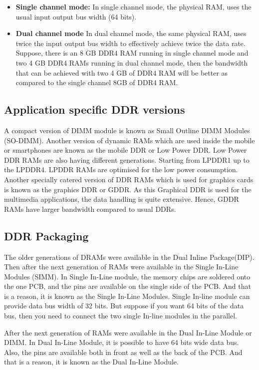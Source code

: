\begin{itemize}
    \item \textbf{Single channel mode:} In single channel mode, the physical RAM, uses the usual input output bus width (64 bits).
    \item \textbf{Dual channel mode} In dual channel mode, the same physical RAM, uses twice the input output bus width to effectively achieve twice the data rate. Suppose, there is an 8 GB DDR4 RAM running in single channel mode and two 4 GB DDR4 RAMs running in dual channel mode, then the bandwidth that can be achieved with two 4 GB of DDR4 RAM will be better as compared to the single channel 8GB of DDR4 RAM.
\end{itemize}

\subsection{Application specific DDR versions}
A compact version of DIMM module is known as Small Outline DIMM Modules (SO-DIMM). Another version of dynamic RAMs which are used inside the mobile or smartphones are known as the mobile DDR or Low Power DDR. Low Power DDR RAMs are also having different generations. Starting from LPDDR1 up to the LPDDR4. LPDDR RAMs are optimised for the low power consumption. Another specially catered version of DDR RAMs which is used for graphics cards is known as the graphics DDR or GDDR. As this Graphical DDR is used for the multimedia applications, the data handling is quite extensive. Hence, GDDR RAMs have larger bandwidth compared to usual DDRs. 

\subsection{DDR Packaging}
The older generations of DRAMs were available in the Dual Inline Package(DIP). Then after the next generation of RAMs were available in the Single In-Line Modules (SIMM). In Single In-Line module, the memory chips are soldered onto the one PCB, and the pins are available on the single side of the PCB. And that is a reason, it is known as the Single In-Line Modules. Single In-line module can provide data bus width of 32 bits. But suppose if you want 64 bits of the data bus, then you need to connect the two single In-line modules in the parallel.

\par After the next generation of RAMs were available in the Dual In-Line Module or DIMM. In Dual In-Line Module, it is possible to have 64 bits wide data bus. Also, the pins are available both in front as well as the back of the PCB. And that is a reason, it is known as the Dual In-Line Module.

